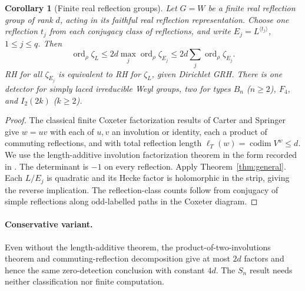 \documentclass[11pt]{article}
\newtheorem{corollary}[theorem]{Corollary}
\theoremstyle{remark}\newtheorem{remark}[theorem]{Remark}
\newcommand{\ord}{\operatorname{ord}}
\begin{document}
\begin{corollary}[Finite real reflection groups]\label{cor:cox}
Let $G=W$ be a finite real reflection group of rank $d$, acting in its faithful real reflection representation. Choose one reflection $t_j$ from each conjugacy class of reflections, and write $E_j=L^{\langle t_j\rangle}$, $1\le j\le q$. Then
\[
 \ord_\rho\zeta_L\le 2d\max_j\ord_\rho\zeta_{E_j}
 \le 2d\sum_j\ord_\rho\zeta_{E_j}.
\]
RH for all $\zeta_{E_j}$ is equivalent to RH for $\zeta_L$, given Dirichlet GRH. There is one detector for simply laced irreducible Weyl groups, two for types $B_n$ ($n\ge2$), $F_4$, and $I_2(2k)$ ($k\ge2$).
\end{corollary}
\begin{proof}
The classical finite Coxeter factorization results of Carter and Springer \cite{carter,springer,hurwitz} give $w=uv$ with each of $u,v$ an involution or identity, each a product of commuting reflections, and with total reflection length $\ell_T(w)=\operatorname{codim}V^w\le d$. We use the length-additive involution factorization theorem in the form recorded in \cite{hurwitz}. The determinant is $-1$ on every reflection. Apply Theorem~\ref{thm:general}. Each $L/E_j$ is quadratic and its Hecke factor is holomorphic in the strip, giving the reverse implication. The reflection-class counts follow from conjugacy of simple reflections along odd-labelled paths in the Coxeter diagram.
\end{proof}
\paragraph{Conservative variant.} Even without the length-additive theorem, the product-of-two-involutions theorem and commuting-reflection decomposition give at most $2d$ factors and hence the same zero-detection conclusion with constant $4d$. The $S_n$ result needs neither classification nor finite computation.
\end{document}

